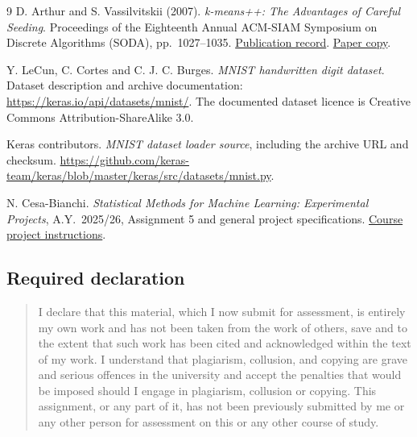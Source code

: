 \documentclass[11pt,a4paper]{article}
\begin{document}
\begingroup
\small
\begin{thebibliography}{9}
D. Arthur and S. Vassilvitskii (2007).
\emph{k-means++: The Advantages of Careful Seeding}.
Proceedings of the Eighteenth Annual ACM-SIAM Symposium on Discrete Algorithms (SODA), pp.~1027--1035.
\href{https://research.google/pubs/k-means-the-advantages-of-careful-seeding/}{Publication record}.
\href{https://www.cs.columbia.edu/~verma/classes/uml/ref/clustering_kmean_plusplus_arthur_vassilvitskii.pdf}{Paper copy}.

Y. LeCun, C. Cortes and C. J. C. Burges.
\emph{MNIST handwritten digit dataset}.
Dataset description and archive documentation:
\url{https://keras.io/api/datasets/mnist/}.
The documented dataset licence is Creative Commons Attribution-ShareAlike 3.0.

Keras contributors.
\emph{MNIST dataset loader source}, including the archive URL and checksum.
\url{https://github.com/keras-team/keras/blob/master/keras/src/datasets/mnist.py}.

N. Cesa-Bianchi.
\emph{Statistical Methods for Machine Learning: Experimental Projects},
A.Y.~2025/26, Assignment 5 and general project specifications.
\href{https://docs.google.com/document/d/1JDqx6WXewBjtiyavpbXPFcB4uJ8KG2EhDKwnX-K8xQM/edit}{Course project instructions}.
\end{thebibliography}
\endgroup

\subsection*{Required declaration}

\begin{quote}
\small
I declare that this material, which I now submit for assessment, is entirely my own work and has not been taken from the work of others, save and to the extent that such work has been cited and acknowledged within the text of my work. I understand that plagiarism, collusion, and copying are grave and serious offences in the university and accept the penalties that would be imposed should I engage in plagiarism, collusion or copying. This assignment, or any part of it, has not been previously submitted by me or any other person for assessment on this or any other course of study.
\end{quote}
\end{document}
